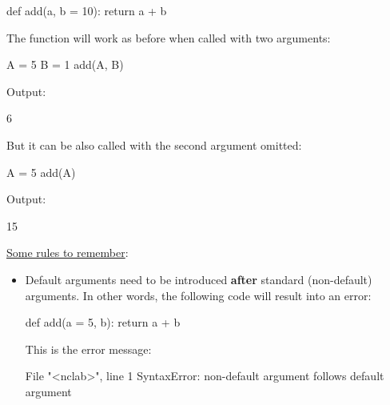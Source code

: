 \begin{bluecode}
def add(a, b = 10):
    return a + b
\end{bluecode}
The function will work as before when called with two arguments: 

\begin{bluecode}
A = 5
B = 1
add(A, B)
\end{bluecode}
Output:
\begin{bluecode}
6
\end{bluecode}
But it can be also called with the second argument omitted:
\begin{bluecode}
A = 5
add(A)
\end{bluecode}
Output:
\begin{bluecode}
15
\end{bluecode}
\underline{Some rules to remember}:
\begin{itemize}
\item Default arguments need to be introduced {\bf after} standard (non-default) arguments. In other words, the 
      following code will result into an error:
\begin{bluecode}
def add(a = 5, b):
    return a + b
\end{bluecode}
This is the error message:
\begin{bluecode}
  File "<nclab>", line 1
SyntaxError: non-default argument follows default argument


\end{bluecode}
\end{itemize}
